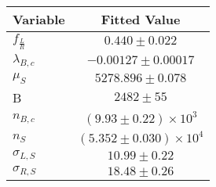 \begin{tabular}[t]{lc}
\hline
Variable &Fitted Value\\
\hline\hline
$f_{\frac{L}{R}}$&$0.440\pm0.022$\\
\hline
$\lambda_{B,c}$&$-0.00127\pm0.00017$\\
\hline
$\mu_S$&$5278.896\pm0.078$\\
\hline
B&$2482\pm55$\\
\hline
$n_{B,c}$&$(9.93\pm0.22)\times 10^3$\\
\hline
$n_S$&$(5.352\pm0.030)\times 10^4$\\
\hline
$\sigma_{L, S}$&$10.99\pm0.22$\\
\hline
$\sigma_{R, S}$&$18.48\pm0.26$\\
\hline
\end{tabular}